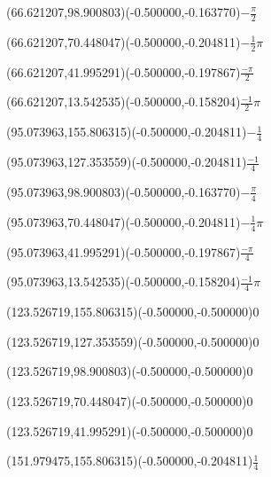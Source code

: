 \documentclass[12pt]{article}
\begin{document}
\ASYalign(66.621207,98.900803)(-0.500000,-0.163770){$-\frac{\pi}{2}$}%
%
%
\fontsize{12.000000}{14.400000}\selectfont%
\ASYalign(66.621207,70.448047)(-0.500000,-0.204811){$-\frac{1}{2}\pi$}%
%
%
\fontsize{12.000000}{14.400000}\selectfont%
\ASYalign(66.621207,41.995291)(-0.500000,-0.197867){$\frac{-\pi}{2}$}%
%
%
\fontsize{12.000000}{14.400000}\selectfont%
\ASYalign(66.621207,13.542535)(-0.500000,-0.158204){$\displaystyle \frac{-1}{2}\pi$}%
%
%
\fontsize{12.000000}{14.400000}\selectfont%
\ASYalign(95.073963,155.806315)(-0.500000,-0.204811){$-\frac{1}{4}$}%
%
%
\fontsize{12.000000}{14.400000}\selectfont%
\ASYalign(95.073963,127.353559)(-0.500000,-0.204811){$\frac{-1}{4}$}%
%
%
\fontsize{12.000000}{14.400000}\selectfont%
\ASYalign(95.073963,98.900803)(-0.500000,-0.163770){$-\frac{\pi}{4}$}%
%
%
\fontsize{12.000000}{14.400000}\selectfont%
\ASYalign(95.073963,70.448047)(-0.500000,-0.204811){$-\frac{1}{4}\pi$}%
%
%
\fontsize{12.000000}{14.400000}\selectfont%
\ASYalign(95.073963,41.995291)(-0.500000,-0.197867){$\frac{-\pi}{4}$}%
%
%
\fontsize{12.000000}{14.400000}\selectfont%
\ASYalign(95.073963,13.542535)(-0.500000,-0.158204){$\displaystyle \frac{-1}{4}\pi$}%
%
%
\fontsize{12.000000}{14.400000}\selectfont%
\ASYalign(123.526719,155.806315)(-0.500000,-0.500000){$0$}%
%
%
\fontsize{12.000000}{14.400000}\selectfont%
\ASYalign(123.526719,127.353559)(-0.500000,-0.500000){$0$}%
%
%
\fontsize{12.000000}{14.400000}\selectfont%
\ASYalign(123.526719,98.900803)(-0.500000,-0.500000){$0$}%
%
%
\fontsize{12.000000}{14.400000}\selectfont%
\ASYalign(123.526719,70.448047)(-0.500000,-0.500000){$0$}%
%
%
\fontsize{12.000000}{14.400000}\selectfont%
\ASYalign(123.526719,41.995291)(-0.500000,-0.500000){$0$}%
%
%
\fontsize{12.000000}{14.400000}\selectfont%
\ASYalign(151.979475,155.806315)(-0.500000,-0.204811){$\frac{1}{4}$}%
%
%
\fontsize{12.000000}{14.400000}\selectfont%
\end{document}
